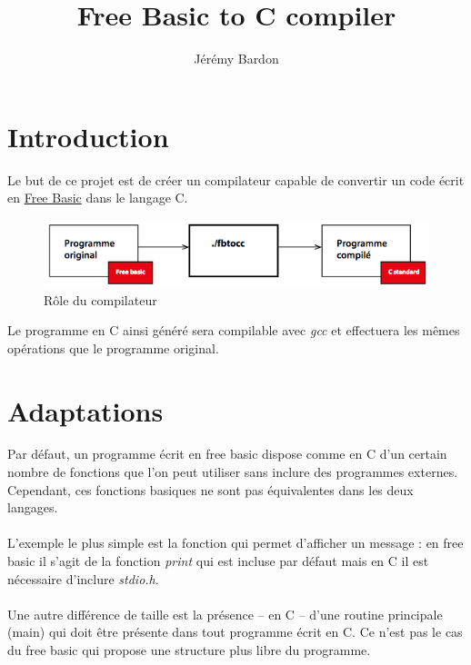 \documentclass{article}
\title{Free Basic to C compiler}
\author{Jérémy Bardon}
\begin{document}
\maketitle

\renewcommand{\contentsname}{Sommaire}
\tableofcontents	
	
\newpage
	
\section{Introduction}
Le but de ce projet est de créer un compilateur capable de convertir un code écrit 
en \href{http://www.freebasic.net}{Free Basic} dans le langage C. 

\begin{figure}[h]
    \centering
    \includegraphics[scale=0.6]{resources/schema.png}
    \caption{Rôle du compilateur}
\end{figure}
	
Le programme en C
ainsi généré sera compilable avec \emph{gcc} et effectuera les mêmes opérations que 
le programme original.
	
\section{Adaptations}
Par défaut, un programme écrit en free basic dispose comme en C d'un 
certain nombre de fonctions que l'on peut utiliser sans inclure des programmes 
externes. Cependant, ces fonctions \og{}basiques\fg{} ne sont pas équivalentes dans 
les deux langages.
\\\\
L'exemple le plus simple est la fonction qui permet d'afficher un message : en 
free basic il s'agit de la fonction \emph{print} qui est incluse 
par défaut mais en C il est nécessaire d'inclure \emph{stdio.h}.
\\\\
Une autre différence de taille est la présence -- en C -- d'une routine principale 
(main) qui doit être présente dans tout programme écrit en C. Ce n'est pas le cas du 
free basic qui propose une structure plus libre du programme.

\lstset{language=c,caption=Programme C englobant}

\end{document}
